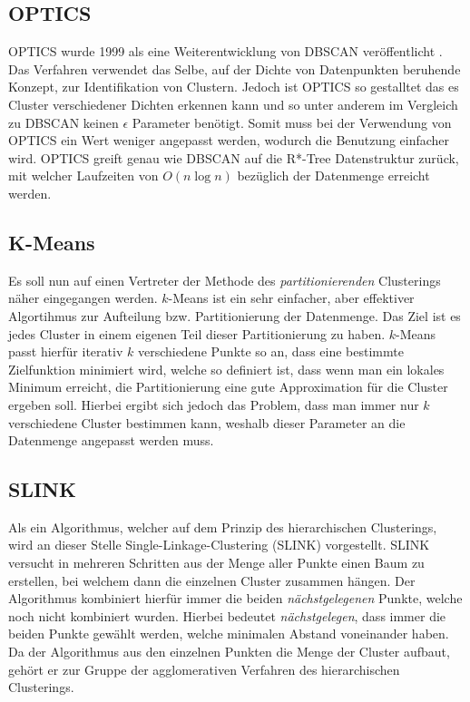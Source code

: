 \documentclass{lni}
\begin{document}

\subsection{OPTICS}
OPTICS wurde 1999 als eine Weiterentwicklung von DBSCAN veröffentlicht \cite{OPTICS}. Das Verfahren verwendet das Selbe, auf der Dichte von Datenpunkten beruhende Konzept, zur Identifikation von Clustern. Jedoch ist OPTICS so gestalltet das es Cluster verschiedener Dichten erkennen kann und so unter anderem im Vergleich zu DBSCAN keinen $\epsilon$ Parameter benötigt. Somit muss bei der Verwendung von OPTICS ein Wert weniger angepasst werden, wodurch die Benutzung einfacher wird. OPTICS greift genau wie DBSCAN auf die R*-Tree Datenstruktur zurück, mit welcher Laufzeiten von $O(n\log n)$ bezüglich der Datenmenge erreicht werden.


\subsection{K-Means}
Es soll nun auf einen Vertreter der Methode des \textit{partitionierenden} Clusterings näher eingegangen werden. $k$-Means \cite{TOP10} ist ein sehr einfacher, aber effektiver Algortihmus zur Aufteilung bzw. Partitionierung der Datenmenge. Das Ziel ist es jedes Cluster in einem eigenen Teil dieser Partitionierung zu haben. $k$-Means passt hierfür iterativ $k$ verschiedene Punkte so an, dass eine bestimmte Zielfunktion minimiert wird, welche so definiert ist, dass wenn man ein lokales Minimum erreicht, die Partitionierung eine gute Approximation für die Cluster ergeben soll. Hierbei ergibt sich jedoch das Problem, dass man immer nur $k$ verschiedene Cluster bestimmen kann, weshalb dieser Parameter an die Datenmenge angepasst werden muss.


\subsection{SLINK}
Als ein Algorithmus, welcher auf dem Prinzip des hierarchischen Clusterings, wird an dieser Stelle Single-Linkage-Clustering  (SLINK) \cite{HIER} vorgestellt. SLINK versucht in mehreren Schritten aus der Menge aller Punkte einen Baum zu erstellen, bei welchem dann die einzelnen Cluster zusammen hängen. Der Algorithmus kombiniert hierfür immer die beiden \textit{nächstgelegenen} Punkte, welche noch nicht kombiniert wurden. Hierbei bedeutet \textit{nächstgelegen}, dass immer die beiden Punkte gewählt werden, welche minimalen Abstand voneinander haben. Da der Algorithmus aus den einzelnen Punkten die Menge der Cluster aufbaut, gehört er zur Gruppe der agglomerativen Verfahren des hierarchischen Clusterings.
\end{document}
